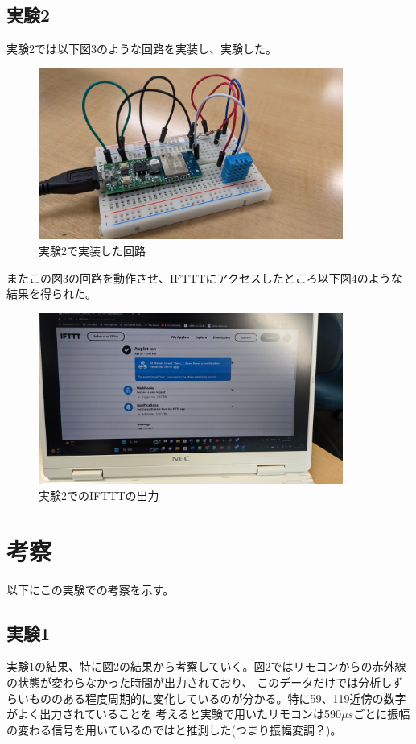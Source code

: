\documentclass[a4paper,11pt,titlepage,dvipdfmx]{jsarticle}
\begin{document}
\subsection{実験2}
実験2では以下図3のような回路を実装し、実験した。
\begin{figure}[h]
    \begin{center}
        \includegraphics[width=100mm]{./circuit2.jpg}
    \end{center}
    \caption{実験2で実装した回路}
\end{figure}

またこの図3の回路を動作させ、IFTTTにアクセスしたところ以下図4のような結果を得られた。
\begin{figure}[h]
    \begin{center}
        \includegraphics[width=100mm]{./Temp.jpg}
    \end{center}
    \caption{実験2でのIFTTTの出力}
\end{figure}
\newpage

\section{考察}
以下にこの実験での考察を示す。
\subsection{実験1}
実験1の結果、特に図2の結果から考察していく。図2ではリモコンからの赤外線の状態が変わらなかった時間が出力されており、
このデータだけでは分析しずらいもののある程度周期的に変化しているのが分かる。特に59、119近傍の数字がよく出力されていることを
考えると実験で用いたリモコンは590$\mu s$ごとに振幅の変わる信号を用いているのではと推測した(つまり振幅変調？)。
\end{document}
